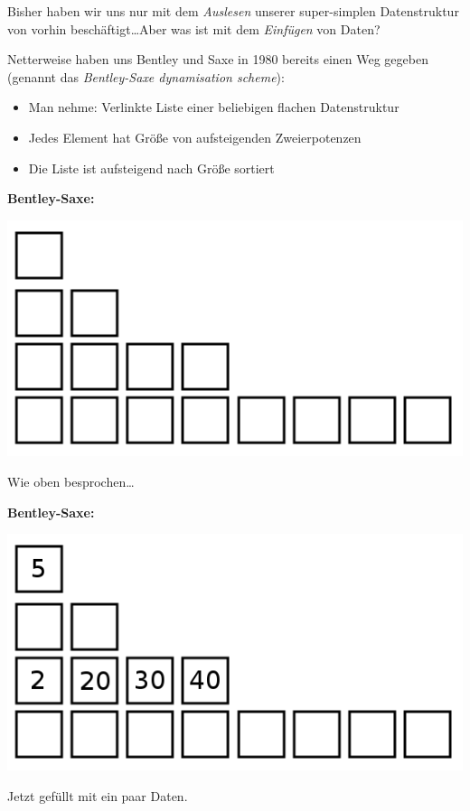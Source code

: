 \documentclass{beamer}
\begin{document}
\begin{frame}
Bisher haben wir uns nur mit dem \emph{Auslesen} unserer super-simplen Datenstruktur von
vorhin beschäftigt\dots Aber was ist mit dem \emph{Einfügen} von Daten?\pause\bigskip

Netterweise haben uns Bentley und Saxe in 1980 bereits einen Weg gegeben (genannt das \emph{Bentley-Saxe dynamisation scheme}):\pause
\begin{itemize}
\item Man nehme: Verlinkte Liste einer beliebigen flachen Datenstruktur\pause
\item Jedes Element hat Größe von aufsteigenden Zweierpotenzen\pause
\item Die Liste ist aufsteigend nach Größe sortiert
\end{itemize}
\end{frame}


\begin{frame}
\textbf{Bentley-Saxe:}
\begin{center}
\includegraphics[scale=0.5]{bentley_saxe_00.png} 
\end{center}

Wie oben besprochen\dots
\end{frame}


\begin{frame}
\textbf{Bentley-Saxe:}
\begin{center}
\includegraphics[scale=0.5]{bentley_saxe_01.png} 
\end{center}

Jetzt gefüllt mit ein paar Daten.
\end{frame}
\end{document}
